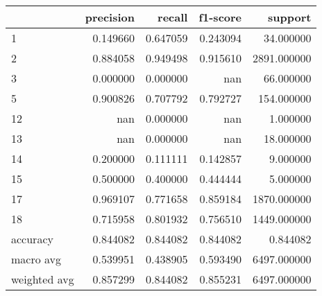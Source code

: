 \begin{tabular}{lrrrr}
\toprule
 & precision & recall & f1-score & support \\
\midrule
1 & 0.149660 & 0.647059 & 0.243094 & 34.000000 \\
2 & 0.884058 & 0.949498 & 0.915610 & 2891.000000 \\
3 & 0.000000 & 0.000000 & nan & 66.000000 \\
5 & 0.900826 & 0.707792 & 0.792727 & 154.000000 \\
12 & nan & 0.000000 & nan & 1.000000 \\
13 & nan & 0.000000 & nan & 18.000000 \\
14 & 0.200000 & 0.111111 & 0.142857 & 9.000000 \\
15 & 0.500000 & 0.400000 & 0.444444 & 5.000000 \\
17 & 0.969107 & 0.771658 & 0.859184 & 1870.000000 \\
18 & 0.715958 & 0.801932 & 0.756510 & 1449.000000 \\
accuracy & 0.844082 & 0.844082 & 0.844082 & 0.844082 \\
macro avg & 0.539951 & 0.438905 & 0.593490 & 6497.000000 \\
weighted avg & 0.857299 & 0.844082 & 0.855231 & 6497.000000 \\
\bottomrule
\end{tabular}
